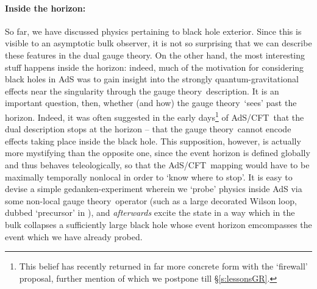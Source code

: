 \documentclass[12pt,a4paper]{article}
\def\sect#1{\S\ref{#1}}
\def\AC{AdS/CFT}
\def\GT{gauge theory}
\begin{document}
\paragraph{Inside the horizon:}  %
So far, we have discussed physics pertaining to black hole exterior.  Since this is visible to an asymptotic bulk observer, it is not so surprising that we can describe these features in the dual \GT.
On the other hand, the most interesting stuff happens inside the horizon:  indeed, much of the motivation for considering black holes in AdS was to gain insight into the strongly quantum-gravitational effects near the singularity through the \GT\ description.  It is an important question, then, whether (and how) the \GT\ `sees' past the horizon.  Indeed, it was often suggested in the early days\footnote{
This belief has recently returned in far more concrete form with the `firewall' proposal, further mention of which we postpone till \sect{s:lessonsGR}.
} of \AC\ that the dual description stops at the horizon -- that the \GT\ cannot encode effects taking place inside the black hole.  This supposition, however, is actually more mystifying than the opposite one, since the event horizon is defined globally and thus behaves teleologically, so that the \AC\ mapping would have to be maximally temporally nonlocal in order to `know where to stop'.  It is easy to devise a simple gedanken-experiment  \cite{Hubeny:2002dg} wherein we `probe' physics inside AdS via some non-local \GT\ operator (such as a large decorated Wilson loop,  dubbed `precursor' in \cite{Polchinski:1999yd}), and {\it afterwards} excite the state in a way which in the bulk  collapses a sufficiently large black hole whose event horizon emcompasses the event which we have already probed.
\end{document}
